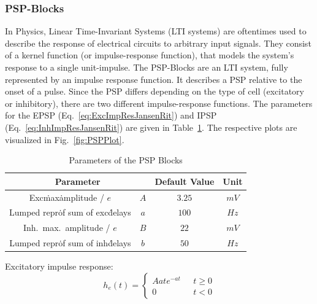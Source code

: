 \subsubsection{PSP-Blocks}
In Physics, Linear Time-Invariant Systems (LTI systems) are oftentimes used to describe the response of
electrical circuits to arbitrary input signals.
They consist of a kernel function (or impulse-response function),
that models the system's response to a single unit-impulse.
The PSP-Blocks are an LTI system, fully represented by an impulse response function.
It describes a PSP relative to the onset of a pulse.
Since the PSP differs depending on the type of cell (excitatory or inhibitory),
there are two different impulse-response functions.
The parameters for the EPSP (Eq.~\ref{eq:ExcImpResJansenRit}) and IPSP (Eq.~\ref{eq:InhImpResJansenRit})
are given in Table~\ref{tab:psp_params}.
The respective plots are visualized in Fig.~\ref{fig:PSPPlot}.
\begin{table}[H]
    \centering
    \begin{tabular}{ |c|c|c|c| }
        \hline
        \multicolumn{2}{|c|}{Parameter} & Default Value & Unit \\
        \hline
        \hline
        Exc\. max\. amplitude / $e$          & \(A\) & \(3.25\) & \(mV\) \\
        \hline
        Lumped repr\. of sum of exc\. delays & \(a\) & \(100\)  & \(Hz\) \\
        \hline
        Inh.\ max.\ amplitude / $e$          & \(B\) & \(22\)   & \(mV\) \\
        \hline
        Lumped repr\. of sum of inh\. delays & \(b\) & \(50\)   & \(Hz\) \\
        \hline
    \end{tabular}
    \caption{Parameters of the PSP Blocks}
    \label{tab:psp_params}
\end{table}

Excitatory impulse response:
\begin{equation}
    h_e(t) = \begin{cases}
                 Aate^{-at} & \mbox{ } t \geq 0 \\
                 0 & \mbox{ } t < 0
    \end{cases} \label{eq:ExcImpResJansenRit}
\end{equation}

